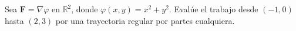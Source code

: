 Sea $\mathbf{F}=\nabla\varphi$ en $\mathbb R^2$, donde $\varphi(x,y)=x^2+y^2$. Evalúe el trabajo desde $(-1,0)$ hasta $(2,3)$ por una trayectoria regular por partes cualquiera.